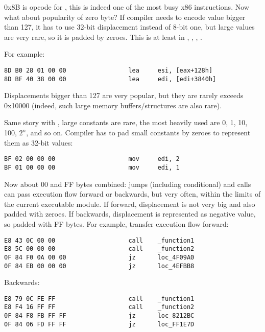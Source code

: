 0x8B is opcode for , this is indeed one of the most busy x86 instructions.
Now what about popularity of zero byte?
If compiler needs to encode value bigger than 127, it has to use 32-bit displacement instead of 8-bit one, but large values are very rare,
so it is padded by zeroes.
This is at least in , , , .

For example:

\begin{lstlisting}
8D B0 28 01 00 00                 lea     esi, [eax+128h]
8D BF 40 38 00 00                 lea     edi, [edi+3840h]
\end{lstlisting}

Displacements bigger than 127 are very popular, but they are rarely exceeds 0x10000
(indeed, such large memory buffers/structures are also rare).

Same story with , large constants are rare, the most heavily used are 0, 1, 10, 100, $2^n$, and so on.
Compiler has to pad small constants by zeroes to represent them as 32-bit values:

\begin{lstlisting}
BF 02 00 00 00                    mov     edi, 2
BF 01 00 00 00                    mov     edi, 1
\end{lstlisting}

Now about 00 and FF bytes combined: jumps (including conditional) and calls can pass execution flow forward or backwards, but very often,
within the limits of the current executable module.
If forward, displacement is not very big and also padded with zeroes.
If backwards, displacement is represented as negative value, so padded with FF bytes.
For example, transfer execution flow forward:

\begin{lstlisting}
E8 43 0C 00 00                    call    _function1
E8 5C 00 00 00                    call    _function2
0F 84 F0 0A 00 00                 jz      loc_4F09A0
0F 84 EB 00 00 00                 jz      loc_4EFBB8
\end{lstlisting}

Backwards:

\begin{lstlisting}
E8 79 0C FE FF                    call    _function1
E8 F4 16 FF FF                    call    _function2
0F 84 F8 FB FF FF                 jz      loc_8212BC
0F 84 06 FD FF FF                 jz      loc_FF1E7D
\end{lstlisting}


